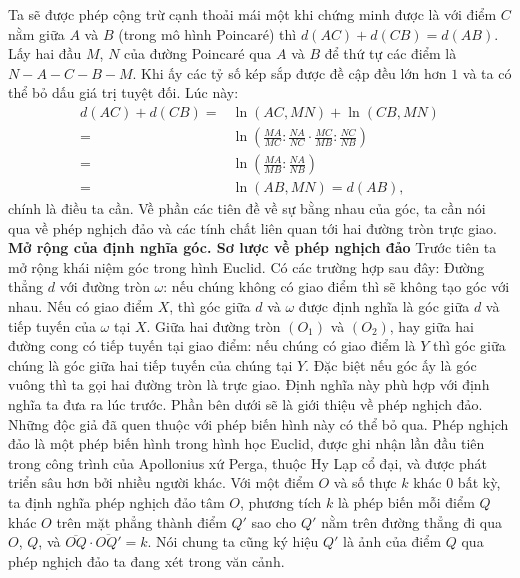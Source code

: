 \begin{multicols}{2}
\begin{figure}[H]
		\vspace*{-15pt}
	\end{figure}
	Ta sẽ được phép cộng trừ cạnh thoải mái một khi chứng minh được là với điểm $C$ nằm giữa $A$ và $B$ (trong mô hình Poincar\'e) thì $d(AC) + d(CB) = d(AB)$. Lấy hai đầu $M$, $N$ của đường Poincar\'e qua $A$ và $B$ để thứ tự các điểm là $N - A - C - B - M$.
	Khi ấy các tỷ số kép sắp được đề cập đều lớn hơn $1$ và ta có thể bỏ dấu giá trị tuyệt đối. Lúc này:
	\begin{align*}
		d(AC) \!+\! d(CB) =& \ln{(AC, MN)} \!+\! \ln{(CB, MN)}\\
		 =& \ln{\left(\!\frac{MA}{MC} \!:\! \frac{NA}{NC} \!\cdot\! \frac{MC}{MB} \!:\! \frac{NC}{NB}\! \right)}\\
		 =& \ln{ \left(\frac{MA}{MB} : \frac{NA}{NB}\right)}\\
		 =& \ln{(AB, MN)} = d(AB),
	 \end{align*}
	chính là điều ta cần.
	\vskip 0.1cm
	Về phần các tiên đề về sự bằng nhau của góc, ta cần nói qua về phép nghịch đảo và các tính chất liên quan tới hai đường tròn trực giao.
	\vskip 0.1cm
	\textbf{\color{lichsutoanhoc}Mở rộng của định nghĩa góc. Sơ lược về phép nghịch đảo}
	\vskip 0.1cm
	Trước tiên ta mở rộng khái niệm góc trong hình Euclid. Có các trường hợp sau đây:
	Đường thẳng $d$ với đường tròn $\omega$: nếu chúng không có giao điểm thì sẽ không tạo góc với nhau. Nếu có giao điểm $X$, thì góc giữa $d$ và $\omega$ được định nghĩa là góc giữa $d$ và tiếp tuyến của $\omega$ tại $X$.
	\vskip 0.1cm
	Giữa hai đường tròn $(O_1)$ và $(O_2)$, hay giữa hai đường cong có tiếp tuyến tại giao điểm: nếu chúng có giao điểm là $Y$ thì góc giữa chúng là góc giữa hai tiếp tuyến của chúng tại $Y$. Đặc biệt nếu góc ấy là góc vuông thì ta gọi hai đường tròn là trực giao. Định nghĩa này phù hợp với định nghĩa ta đưa ra lúc trước. 
	\vskip 0.1cm
	Phần bên dưới sẽ là giới thiệu về phép nghịch đảo. Những độc giả đã quen thuộc với phép biến hình này có thể bỏ qua. 
	\vskip 0.1cm
	Phép nghịch đảo là một phép biến hình trong hình học Euclid, được ghi nhận lần đầu tiên trong công trình của Apollonius xứ Perga, thuộc Hy Lạp cổ đại, và được phát triển sâu hơn bởi nhiều người khác.
	\vskip 0.1cm
	Với một điểm $O$ và số thực $k$ khác $0$ bất kỳ, ta định nghĩa phép nghịch đảo tâm $O$, phương tích $k$ là phép biến mỗi điểm $Q$ khác $O$ trên mặt phẳng thành điểm $Q'$ sao cho $Q'$ nằm trên đường thẳng đi qua $O$, $Q$, và 
	$ \overline{OQ}\cdot \overline{OQ'} = k$. 
	Nói chung ta cũng ký hiệu $Q'$ là ảnh của điểm $Q$ qua phép nghịch đảo ta đang xét trong văn cảnh.

\end{multicols}

